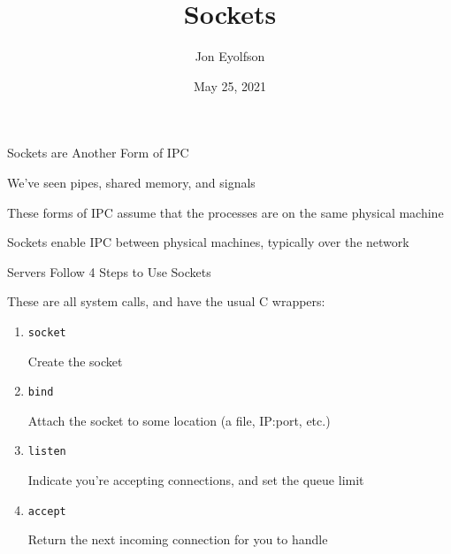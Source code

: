 

\title{Sockets}
\author{Jon Eyolfson}
\date{May 25, 2021}


  \begin{frame}
    \titlepage
  \end{frame}

  \begin{frame}{Sockets are Another Form of IPC}

    We've seen pipes, shared memory, and signals

    \vspace{2em}

    These forms of IPC assume that the processes are on the same physical
    machine

    \vspace{2em}

    Sockets enable IPC between physical machines, typically over the network
  \end{frame}

  \begin{frame}{Servers Follow 4 Steps to Use Sockets}

    These are all system calls, and have the usual C wrappers:

    \vspace{2em}

    \begin{enumerate}
      \item \texttt{socket}

        \hspace{2em} Create the socket
      \item \texttt{bind}

        \hspace{2em} Attach the socket to some location (a file, IP:port, etc.)
      \item \texttt{listen}

        \hspace{2em} Indicate you're accepting connections, and set the queue limit
      \item \texttt{accept}

        \hspace{2em} Return the next incoming connection for you to handle
    \end{enumerate}
  \end{frame}

